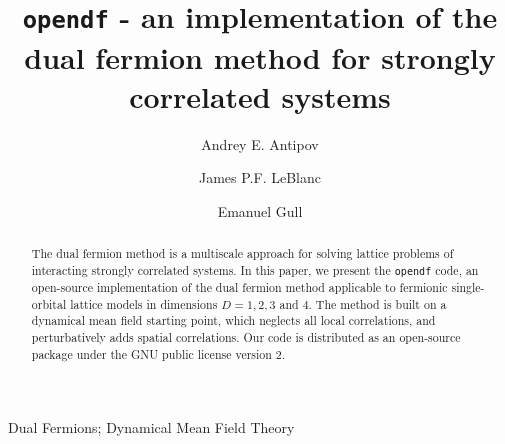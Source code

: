 \documentclass[3p,times,procedia]{elsarticle}
\begin{document}
\begin{frontmatter}




\title{\texttt{opendf} - an implementation of the dual fermion method for strongly correlated systems }




\author[a]{Andrey E. Antipov} 
\author[a]{James P.F. LeBlanc}
\author[a]{Emanuel Gull}

\address[a]{Department of Physics, University of Michigan, Ann Arbor, Michigan 48109, USA}

\begin{abstract}
The dual fermion method is a multiscale approach for solving lattice problems of interacting strongly correlated systems. In this paper, we present the \texttt{opendf} code, an open-source implementation of the dual fermion method applicable to fermionic single-orbital lattice models in dimensions $D=1,2,3$ and $4$. The method is built on a dynamical mean field starting point, which neglects all local correlations, and perturbatively adds spatial correlations. Our code is distributed as an open-source package under the GNU public license version 2.
\end{abstract}

\begin{keyword}
Dual Fermions; Dynamical Mean Field Theory
\end{keyword}
\end{frontmatter}
\end{document}
